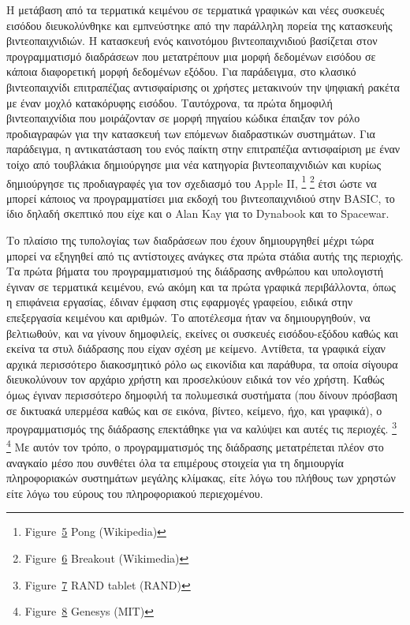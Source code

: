 \documentclass[
]{article}
\begin{document}
Η μετάβαση από τα τερματικά κειμένου σε τερματικά γραφικών και νέες
συσκευές εισόδου διευκολύνθηκε και εμπνεύστηκε από την παράλληλη πορεία
της κατασκευής βιντεοπαιχνιδιών. Η κατασκευή ενός καινοτόμου
βιντεοπαιχνιδιού βασίζεται στον προγραμματισμό διαδράσεων που
μετατρέπουν μια μορφή δεδομένων εισόδου σε κάποια διαφορετική μορφή
δεδομένων εξόδου. Για παράδειγμα, στο κλασικό βιντεοπαιχνίδι
επιτραπέζιας αντισφαίρισης οι χρήστες μετακινούν την ψηφιακή ρακέτα με
έναν μοχλό κατακόρυφης εισόδου. Ταυτόχρονα, τα πρώτα δημοφιλή
βιντεοπαιχνίδια που μοιράζονταν σε μορφή πηγαίου κώδικα έπαιξαν τον ρόλο
προδιαγραφών για την κατασκευή των επόμενων διαδραστικών συστημάτων. Για
παράδειγμα, η αντικατάσταση του ενός παίκτη στην επιτραπέζια
αντισφαίριση με έναν τοίχο από τουβλάκια δημιούργησε μια νέα κατηγορία
βιντεοπαιχνιδιών και κυρίως δημιούργησε τις προδιαγραφές για τον
σχεδιασμό του Apple II, \footnote{Figure~\protect\hyperlink{fig:pong}{5}
  Pong (Wikipedia)} \footnote{Figure~\protect\hyperlink{fig:breakout}{6}
  Breakout (Wikimedia)} έτσι ώστε να μπορεί κάποιος να προγραμματίσει
μια εκδοχή του βιντεοπαιχνιδιού στην BASIC, το ίδιο δηλαδή σκεπτικό που
είχε και ο Alan Kay για το Dynabook και το Spacewar.

Το πλαίσιο της τυπολογίας των διαδράσεων που έχουν δημιουργηθεί μέχρι
τώρα μπορεί να εξηγηθεί από τις αντίστοιχες ανάγκες στα πρώτα στάδια
αυτής της περιοχής. Τα πρώτα βήματα του προγραμματισμού της διάδρασης
ανθρώπου και υπολογιστή έγιναν σε τερματικά κειμένου, ενώ ακόμη και τα
πρώτα γραφικά περιβάλλοντα, όπως η επιφάνεια εργασίας, έδιναν έμφαση
στις εφαρμογές γραφείου, ειδικά στην επεξεργασία κειμένου και αριθμών.
Το αποτέλεσμα ήταν να δημιουργηθούν, να βελτιωθούν, και να γίνουν
δημοφιλείς, εκείνες οι συσκευές εισόδου-εξόδου καθώς και εκείνα τα στυλ
διάδρασης που είχαν σχέση με κείμενο. Αντίθετα, τα γραφικά είχαν αρχικά
περισσότερο διακοσμητικό ρόλο ως εικονίδια και παράθυρα, τα οποία
σίγουρα διευκολύνουν τον αρχάριο χρήστη και προσελκύουν ειδικά τον νέο
χρήστη. Καθώς όμως έγιναν περισσότερο δημοφιλή τα πολυμεσικά συστήματα
(που δίνουν πρόσβαση σε δικτυακά υπερμέσα καθώς και σε εικόνα, βίντεο,
κείμενο, ήχο, και γραφικά), ο προγραμματισμός της διάδρασης επεκτάθηκε
για να καλύψει και αυτές τις περιοχές. \footnote{Figure~\protect\hyperlink{fig:rand-tablet}{7}
  RAND tablet (RAND)} \footnote{Figure~\protect\hyperlink{fig:genesys}{8}
  Genesys (MIT)} Με αυτόν τον τρόπο, ο προγραμματισμός της διάδρασης
μετατρέπεται πλέον στο αναγκαίο μέσο που συνθέτει όλα τα επιμέρους
στοιχεία για τη δημιουργία πληροφοριακών συστημάτων μεγάλης κλίμακας,
είτε λόγω του πλήθους των χρηστών είτε λόγω του εύρους του πληροφοριακού
περιεχομένου.
\end{document}
